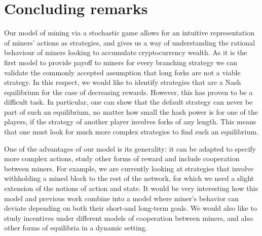 \documentclass[a4paper,english,cleveref, autoref,numberwithinsect]{lipics-v2019}
\newcommand{\forkm}[1]{F^{#1}}
\newcommand{\fg}{\text{\rm FG}}
\begin{document}
\begin{comment}
\paragraph{When to fork?} Having the utilities of the two forking strategies, we can now compare them to that of the default strategy in order to answer whether 1 should fork or not. Analysing the curves defined by the game parameters ($\alpha,\beta$ and $h$ for $\fg$, and additionally $m$ for $\forkm{m}$), it can be seen that when $h>50\%$, and $\alpha>\beta$, then it is always convenient for 1 to fork, based on the utility resulting from either $\fg$ or (irrespective of $m$) $\forkm{m}$. This confirms the intuition that the player with the majority of hash power can sway the game in her favour, but we can also see that there are several cases when it is convenient to fork even with much lower hash power. This happens in cases when $\alpha$ is significantly bigger than $\beta$, which can be explained by the fact that ???

\end{comment}

\section{Concluding remarks}
\label{sec-con-r}

Our model of mining via a stochastic game allows for an intuitive representation of miners' actions as strategies, 
and gives us a way of understanding the rational behaviour of miners looking to accumulate cryptocurrency wealth. As it is the first model to provide payoff to miners for every branching strategy we can validate the commonly accepted assumption that long forks are not a viable strategy.
In this respect, we would like to identify strategies that are a Nash equilibrium for the case of decreasing rewards. However, this has proven 
to be a difficult task. In particular, one can show that the default strategy can never be part of such an 
equilibrium, no matter how small the hash power is for one of the players, if the strategy of another player involves forks of any length. 
This means that one must look for much more complex strategies to find such an equilibrium. 

One of the advantages of our model is its generality: it can be adapted to specify more complex 
actions, study other forms of reward and include cooperation between miners. For example, 
we are currently looking at strategies that involve withholding 
a mined block to the rest of the network, for which we need a slight extension of the notions of action and state. 
It would be very interesting how this model and previous work combine into a model where miner's behavior can deviate depending on both their short-and long-term 
goals. We would also like to study incentives under different models of cooperation between miners, and 
also other forms of equilibria in a dynamic setting. 



\clearpage



\end{document}
